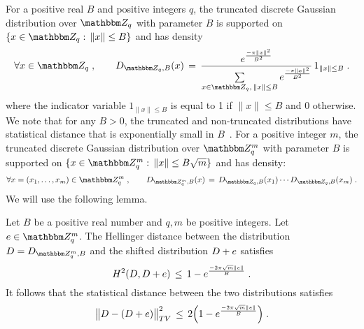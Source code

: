 

For a positive real $B$ and positive integers $q$, the truncated discrete Gaussian distribution over $\mZ_q$ with parameter $B$ is supported on $\{x\in\mZ_q:\,\|x\|\leq B\}$ and has density
\begin{equation}\label{eq:d-bounded-def}
\forall x \in \mZ_q\;,\qquad D_{\mZ_q,B}(x) \,=\, \frac{e^{\frac{-\pi\lVert x\rVert^2}{B^2}}}{\sum\limits_{x\in\mZ_q,\, \|x\|\leq B}e^{\frac{-\pi\lVert x\rVert^2}{B^2}}} \,1_{\|x\|\leq B}\;.
\end{equation}
where the indicator variable $1_{\|x\|\leq B}$ is equal to 1 if $\|x\|\leq B$ and 0 otherwise. We note that for any $B>0$, the truncated and non-truncated distributions have statistical distance that is exponentially small in $B$~\cite[Lemma 1.5]{banaszczyk1993new}. For a positive integer $m$, the truncated discrete Gaussian distribution over $\mZ_q^m$ with parameter $B$ is supported on $\{x\in\mZ_q^m:\,\|x\|\leq B\sqrt{m}\}$ and has density:
\begin{equation}\label{eq:d-bounded-def-m}
\forall x = (x_1,\ldots,x_m) \in \mZ_q^m\;,\qquad D_{\mZ_q^m,B}(x) \,=\, D_{\mZ_q,B}(x_1)\cdots D_{\mZ_q,B}(x_m)\;.
\end{equation}
We will use the following lemma. 

\begin{lemma}\label{lem:distributiondistance}
Let $B$ be a positive real number and $q,m$ be positive integers. Let $\*e \in \mZ_q^m$. The Hellinger distance between the distribution $D = D_{\mZ_q^{m},B}$ and the shifted distribution $D+\*e$ satisfies
\begin{equation}
H^2(D,D+\*e) \,\leq\, 1- e^{\frac{-2\pi \sqrt{m}\|\*e\|}{B}}\;.
\end{equation}
It follows that the statistical distance between the two distributions satisfies
\begin{equation}
\big\| D - (D+\*e) \big\|_{TV}^2 \,\leq\, 2\Big(1 - e^{\frac{-2\pi \sqrt{m}\|\*e\|}{B}}\Big)\;.
\end{equation}
\end{lemma}

